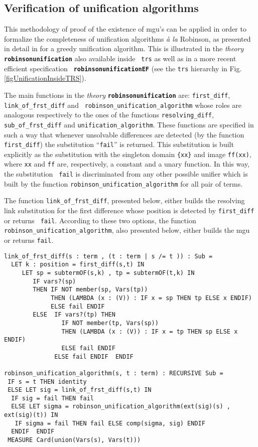 \documentclass[submission,copyright,creativecommons]{eptcs}
\begin{document}
\subsection{Verification of unification algorithms}

This methodology of proof of the existence of mgu's can be applied in
order to formalize the completeness of unification algorithms {\em \`a
  la} Robinson, as presented in detail in \cite{AMARG2010} for a
greedy unification algorithm.  This is illustrated in the
\emph{theory} {\tt \bf robinsonunification} also available inside {\tt
  trs} as well as in a more recent efficient specification {\tt\bf
  robinsonunificationEF} (see the {\tt trs} hierarchy in
Fig. \ref{figUnificationInsideTRS}).

The main functions in the \emph{theory} {\tt \bf robinsonunification}
are: {\tt first\_diff}, {\tt link\_of\_frst\_diff} and {\tt
  robinson\_unification\_algorithm} whose roles are analogous
respectively to the ones of the functions {\tt resolving\_diff}, {\tt
  sub\_of\_frst\_diff} and {\tt unification\_algorithm}.  These
functions are specified in such a way that whenever unsolvable
differences are detected (by the function {\tt first\_diff}) the
substitution ``{\tt fail}'' is returned. This substitution is built
explicitly as the substitution with the singleton domain {\tt \{xx\}}
and image {\tt ff(xx)}, where {\tt xx} and {\tt ff} are, respectively,
a constant and a unary function. In this way, the substitution {\tt
  fail} is discriminated from any other possible unifier which is
built by the function {\tt robinson\_unification\_algorithm} for all
pair of terms.

The function {\tt link\_of\_frst\_diff}, presented below, either
builds the resolving link substitution for the first difference whose
position is detected by {\tt first\_diff} or returns {\tt
  fail}. According to these two options, the function {\tt
  robinson\_unification\_algorithm}, also presented below, either
builds the mgu or returns {\tt fail}.

{\small
\begin{verbatim}
link_of_frst_diff(s : term , (t : term | s /= t )) : Sub =
  LET k : position = first_diff(s,t) IN
     LET sp = subtermOF(s,k) , tp = subtermOF(t,k) IN 
        IF vars?(sp) 
        THEN IF NOT member(sp, Vars(tp))
             THEN (LAMBDA (x : (V)) : IF x = sp THEN tp ELSE x ENDIF)
             ELSE fail ENDIF 
        ELSE  IF vars?(tp) THEN 
                IF NOT member(tp, Vars(sp))
                THEN (LAMBDA (x : (V)) : IF x = tp THEN sp ELSE x ENDIF)
                ELSE fail ENDIF           
              ELSE fail ENDIF  ENDIF

robinson_unification_algorithm(s, t : term) : RECURSIVE Sub =
 IF s = t THEN identity  
 ELSE LET sig = link_of_frst_diff(s,t) IN
  IF sig = fail THEN fail
  ELSE LET sigma = robinson_unification_algorithm(ext(sig)(s) , ext(sig)(t)) IN
   IF sigma = fail THEN fail ELSE comp(sigma, sig) ENDIF
  ENDIF  ENDIF
 MEASURE Card(union(Vars(s), Vars(t)))
\end{verbatim}
}
\end{document}
